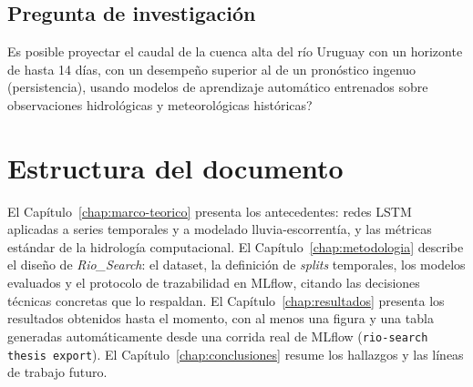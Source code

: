 \subsection{Pregunta de investigaci\'on}

\textquestiondown Es posible proyectar el caudal de la cuenca alta del r\'io Uruguay con un
horizonte de hasta 14 d\'ias, con un desempe\~no superior al de un pron\'ostico ingenuo
(persistencia), usando modelos de aprendizaje autom\'atico entrenados sobre observaciones
hidrol\'ogicas y meteorol\'ogicas hist\'oricas?

\section{Estructura del documento}

El Cap\'itulo~\ref{chap:marco-teorico} presenta los antecedentes: redes LSTM aplicadas a series
temporales y a modelado lluvia-escorrent\'ia, y las m\'etricas est\'andar de la hidrolog\'ia
computacional. El Cap\'itulo~\ref{chap:metodologia} describe el dise\~no de \emph{Rio\_Search}: el
dataset, la definici\'on de \emph{splits} temporales, los modelos evaluados y el protocolo de
trazabilidad en MLflow, citando las decisiones t\'ecnicas concretas que lo respaldan. El
Cap\'itulo~\ref{chap:resultados} presenta los resultados obtenidos hasta el momento, con al menos
una figura y una tabla generadas autom\'aticamente desde una corrida real de MLflow
(\texttt{rio-search thesis export}). El Cap\'itulo~\ref{chap:conclusiones} resume los hallazgos y
las l\'ineas de trabajo futuro.
